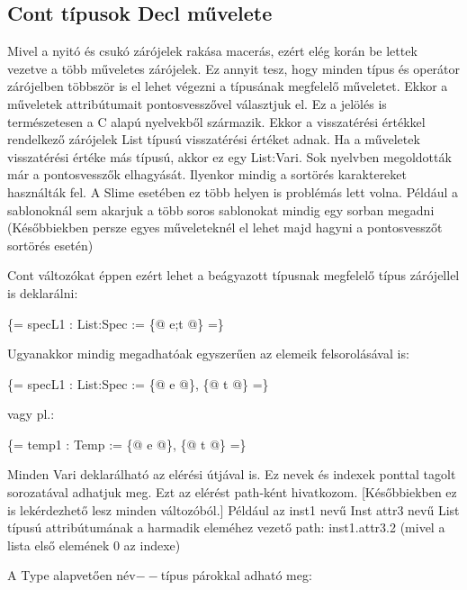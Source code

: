 \subsection{Cont típusok Decl művelete}
Mivel a nyitó és csukó zárójelek rakása macerás, ezért elég korán be lettek vezetve a több műveletes zárójelek.
Ez annyit tesz, hogy minden típus és operátor zárójelben többször is el lehet végezni a típusának megfelelő műveletet.
Ekkor a műveletek attribútumait pontosvesszővel választjuk el.
Ez a jelölés is természetesen a C alapú nyelvekből származik. 
Ekkor a visszatérési értékkel rendelkező zárójelek List típusú visszatérési értéket adnak.
Ha a műveletek visszatérési értéke más típusú, akkor ez egy List:Vari. 
Sok nyelvben megoldották már a pontosvesszők elhagyását.
Ilyenkor mindig a sortörés karaktereket használták fel.
A Slime  esetében ez több helyen is problémás lett volna.
Például a sablonoknál sem akarjuk a több soros sablonokat mindig egy sorban megadni
(Későbbiekben persze egyes műveleteknél el lehet majd hagyni a pontosvesszőt sortörés esetén)

Cont változókat éppen ezért lehet a beágyazott típusnak megfelelő típus zárójellel is deklarálni:

\{= specL1 : List:Spec := \{@ e;t @\} =\}

Ugyanakkor mindig megadhatóak egyszerűen az elemeik felsorolásával is:

\{= specL1 : List:Spec := \{@ e @\}, \{@ t @\} =\}

vagy pl.:

\{= temp1 : Temp := \{@ e @\}, \{@ t @\} =\}

Minden Vari deklarálható az elérési útjával is.
Ez nevek és indexek ponttal tagolt sorozatával adhatjuk meg.
Ezt az elérést path-ként hivatkozom.
[Későbbiekben ez is lekérdezhető lesz minden változóból.]
Például az inst1 nevű Inst attr3 nevű List típusú attribútumának a harmadik eleméhez vezető path: inst1.attr3.2 
(mivel a lista első elemének 0 az indexe)

A Type alapvetően név$--$típus párokkal adható meg:

